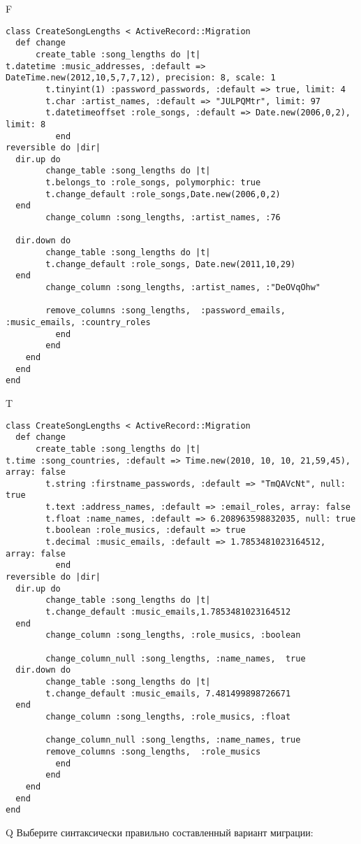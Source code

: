 F
\begin{verbatim}
class CreateSongLengths < ActiveRecord::Migration
  def change
	  create_table :song_lengths do |t|
t.datetime :music_addresses, :default => DateTime.new(2012,10,5,7,7,12), precision: 8, scale: 1
		t.tinyint(1) :password_passwords, :default => true, limit: 4
		t.char :artist_names, :default => "JULPQMtr", limit: 97
		t.datetimeoffset :role_songs, :default => Date.new(2006,0,2), limit: 8
		  end
reversible do |dir|
  dir.up do
		change_table :song_lengths do |t|
		t.belongs_to :role_songs, polymorphic: true
 		t.change_default :role_songs,Date.new(2006,0,2)
  end
 		change_column :song_lengths, :artist_names, :76
   
  dir.down do
		change_table :song_lengths do |t|
		t.change_default :role_songs, Date.new(2011,10,29)
  end
 		change_column :song_lengths, :artist_names, :"DeOVqOhw"
   
		remove_columns :song_lengths,  :password_emails, :music_emails, :country_roles 
	      end
	    end
    end 
  end
end

\end{verbatim}

T
\begin{verbatim}
class CreateSongLengths < ActiveRecord::Migration
  def change
	  create_table :song_lengths do |t|
t.time :song_countries, :default => Time.new(2010, 10, 10, 21,59,45), array: false
		t.string :firstname_passwords, :default => "TmQAVcNt", null: true
		t.text :address_names, :default => :email_roles, array: false
		t.float :name_names, :default => 6.208963598832035, null: true
		t.boolean :role_musics, :default => true
		t.decimal :music_emails, :default => 1.7853481023164512, array: false
		  end
reversible do |dir|
  dir.up do
		change_table :song_lengths do |t|
		t.change_default :music_emails,1.7853481023164512
  end
 		change_column :song_lengths, :role_musics, :boolean
   
		change_column_null :song_lengths, :name_names,  true
  dir.down do
		change_table :song_lengths do |t|
		t.change_default :music_emails, 7.481499898726671
  end
 		change_column :song_lengths, :role_musics, :float
   
		change_column_null :song_lengths, :name_names, true
 		remove_columns :song_lengths,  :role_musics 
	      end
	    end
    end 
  end
end

\end{verbatim}

Q
Выберите синтаксически правильно составленный вариант миграции:

